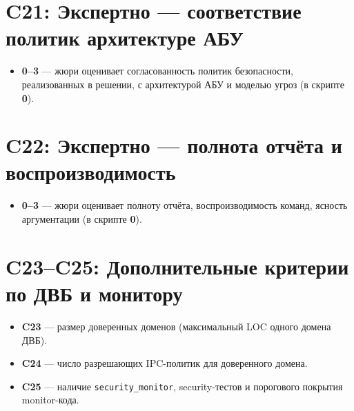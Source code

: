\section*{C21: Экспертно --- соответствие политик архитектуре АБУ}
\begin{itemize}
  \item \textbf{0--3} --- жюри оценивает согласованность политик безопасности, реализованных в решении, с архитектурой АБУ и моделью угроз (в скрипте \textbf{0}).
\end{itemize}

\section*{C22: Экспертно --- полнота отчёта и воспроизводимость}
\begin{itemize}
  \item \textbf{0--3} --- жюри оценивает полноту отчёта, воспроизводимость команд, ясность аргументации (в скрипте \textbf{0}).
\end{itemize}

\section*{C23--C25: Дополнительные критерии по ДВБ и монитору}
\begin{itemize}
  \item \textbf{C23} --- размер доверенных доменов (максимальный LOC одного домена ДВБ).
  \item \textbf{C24} --- число разрешающих IPC-политик для доверенного домена.
  \item \textbf{C25} --- наличие \texttt{security\_monitor}, security-тестов и порогового покрытия monitor-кода.
\end{itemize}
